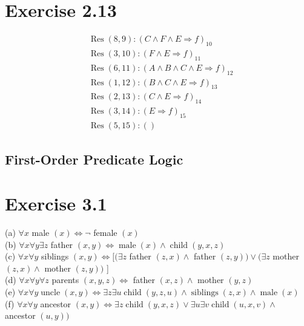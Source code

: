 \documentclass[10pt]{book}
\begin{document}
\section*{Exercise 2.13}
$$
\begin{aligned}
& \operatorname{Res}(8,9):(C \wedge F \wedge E \Rightarrow f)_{10} \\
& \operatorname{Res}(3,10):(F \wedge E \Rightarrow f)_{11} \\
& \operatorname{Res}(6,11):(A \wedge B \wedge C \wedge E \Rightarrow f)_{12} \\
& \operatorname{Res}(1,12):(B \wedge C \wedge E \Rightarrow f)_{13} \\
& \operatorname{Res}(2,13):(C \wedge E \Rightarrow f)_{14} \\
& \operatorname{Res}(3,14):(E \Rightarrow f)_{15} \\
& \operatorname{Res}(5,15):()
\end{aligned}
$$

\subsection*{First-Order Predicate Logic}
\section*{Exercise 3.1}
(a) $\forall x$ male $(x) \Leftrightarrow \neg$ female $(x)$\\
(b) $\forall x \forall y \exists z$ father $(x, y) \Leftrightarrow \operatorname{male}(x) \wedge \operatorname{child}(y, x, z)$\\
(c) $\forall x \forall y$ siblings $(x, y) \Leftrightarrow[(\exists z$ father $(z, x) \wedge$ father $(z, y)) \vee(\exists z$ mother $(z, x) \wedge$ mother $(z, y))$ ]\\
(d) $\forall x \forall y \forall z$ parents $(x, y, z) \Leftrightarrow$ father $(x, z) \wedge$ mother $(y, z)$\\
(e) $\forall x \forall y \operatorname{uncle}(x, y) \Leftrightarrow \exists z \exists u \operatorname{child}(y, z, u) \wedge \operatorname{siblings}(z, x) \wedge \operatorname{male}(x)$\\
(f) $\forall x \forall y$ ancestor $(x, y) \Leftrightarrow \exists z \operatorname{child}(y, x, z) \vee \exists u \exists v \operatorname{child}(u, x, v) \wedge$ ancestor $(u, y))$
\end{document}
